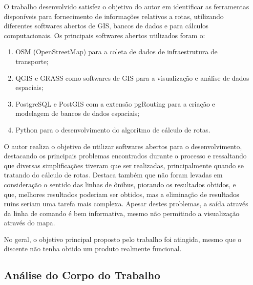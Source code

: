 \documentclass[
    article,
    12pt,
    a4paper,
    english,
    brazil,
    sumario=tradicional
]{/home/lucas_galdino/Desktop/TCC/planning/abntex2/abntex2}
\begin{document}
O trabalho desenvolvido satisfez o objetivo do autor em identificar as ferramentas disponíveis para fornecimento de informações
relativos a rotas, utilizando diferentes softwares abertos de GIS, bancos de dados e para cálculos computacionais.
Os principais softwares abertos utilizados foram o:
\begin{enumerate}
    \item OSM (OpenStreetMap) para a coleta de dados de infraestrutura de transporte;
    \item QGIS e GRASS como softwares de GIS para a visualização e análise de dados espaciais;
    \item PostgreSQL e PostGIS com a extensão pgRouting para a criação e modelagem de bancos de dados espaciais;
    \item Python para o desenvolvimento do algoritmo de cálculo de rotas.
\end{enumerate}\par

O autor realiza o objetivo de utilizar softwares abertos para o desenvolvimento, destacando os principais problemas encontrados durante o processo e ressaltando que diversas simplificações tiveram que ser realizadas, principalmente quando se tratando do cálculo de rotas. Destaca também que não foram levadas em consideração o sentido das linhas de ônibus, piorando os resultados obtidos, e que, melhores resultados poderiam ser obtidos, mas a eliminação de resultados ruins seriam uma tarefa mais complexa.
Apesar destes problemas, a saída através da linha de comando é bem informativa, mesmo não permitindo a visualização através do mapa.\par

No geral, o objetivo principal proposto pelo trabalho foi atingida, mesmo que o discente não tenha obtido um produto realmente funcional.\par

\subsection{Análise do Corpo do Trabalho}
\end{document}
